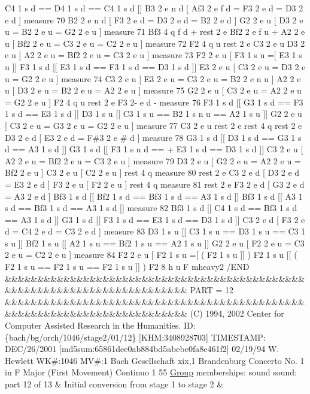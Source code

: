 C4 1 s d == D4 1 s d == C4 1 s d \mbox{]}\mbox{]} B3 2 e n d \mbox{[} Af3 2 e f d = F3 2 e d = D3 2 e d \mbox{]} measure 70 B2 2 e n d \mbox{[} F3 2 e d = D3 2 e d = B2 2 e d \mbox{]} G2 2 e u \mbox{[} D3 2 e u = B2 2 e u = G2 2 e u \mbox{]} measure 71 Bf3 4 q f d + rest 2 e Bf2 2 e f u + A2 2 e u \mbox{[} Bf2 2 e u = C3 2 e u = C2 2 e u \mbox{]} measure 72 F2 4 q u rest 2 e C3 2 e u D3 2 e u \mbox{[} A2 2 e u = Bf2 2 e u = C3 2 e u \mbox{]} measure 73 F2 2 e u \mbox{[} F3 1 s u =\mbox{[} E3 1 s u \mbox{]}\mbox{]} F3 1 s d \mbox{[}\mbox{[} E3 1 s d == F3 1 s d == D3 1 s d \mbox{]}\mbox{]} E3 2 e u \mbox{[} C3 2 e u = D3 2 e u = G2 2 e u \mbox{]} measure 74 C3 2 e u \mbox{[} E3 2 e u = C3 2 e u = B2 2 e n u \mbox{]} A2 2 e u \mbox{[} D3 2 e u = B2 2 e u = A2 2 e u \mbox{]} measure 75 G2 2 e u \mbox{[} C3 2 e u = A2 2 e u = G2 2 e u \mbox{]} F2 4 q u rest 2 e F3 2-\/ e d -\/ measure 76 F3 1 s d \mbox{[}\mbox{[} G3 1 s d == F3 1 s d == E3 1 s d \mbox{]}\mbox{]} D3 1 s u \mbox{[}\mbox{[} C3 1 s u == B2 1 s n u == A2 1 s u \mbox{]}\mbox{]} G2 2 e u \mbox{[} C3 2 e u = G3 2 e u = G2 2 e u \mbox{]} measure 77 C3 2 e u rest 2 e rest 4 q rest 2 e D3 2 e d \mbox{[} E3 2 e d = F\#3 2 e \# d \mbox{]} measure 78 G3 1 s d \mbox{[}\mbox{[} D3 1 s d == G3 1 s d == A3 1 s d \mbox{]}\mbox{]} G3 1 s d \mbox{[}\mbox{[} F3 1 s n d == + E3 1 s d == D3 1 s d \mbox{]}\mbox{]} C3 2 e u \mbox{[} A2 2 e u = Bf2 2 e u = C3 2 e u \mbox{]} measure 79 D3 2 e u \mbox{[} G2 2 e u = A2 2 e u = Bf2 2 e u \mbox{]} C3 2 e u \mbox{[} C2 2 e u \mbox{]} rest 4 q measure 80 rest 2 e C3 2 e d \mbox{[} D3 2 e d = E3 2 e d \mbox{]} F3 2 e u \mbox{[} F2 2 e u \mbox{]} rest 4 q measure 81 rest 2 e F3 2 e d \mbox{[} G3 2 e d = A3 2 e d \mbox{]} Bf3 1 s d \mbox{[}\mbox{[} Bf2 1 s d == Bf3 1 s d == A3 1 s d \mbox{]}\mbox{]} Bf3 1 s d \mbox{[}\mbox{[} A3 1 s d == Bf3 1 s d == A3 1 s d \mbox{]}\mbox{]} measure 82 Bf3 1 s d \mbox{[}\mbox{[} C4 1 s d == Bf3 1 s d == A3 1 s d \mbox{]}\mbox{]} G3 1 s d \mbox{[}\mbox{[} F3 1 s d == E3 1 s d == D3 1 s d \mbox{]}\mbox{]} C3 2 e d \mbox{[} F3 2 e d = C4 2 e d = C3 2 e d \mbox{]} measure 83 D3 1 s u \mbox{[}\mbox{[} C3 1 s u == D3 1 s u == C3 1 s u \mbox{]}\mbox{]} Bf2 1 s u \mbox{[}\mbox{[} A2 1 s u == Bf2 1 s u == A2 1 s u \mbox{]}\mbox{]} G2 2 e u \mbox{[} F2 2 e u = C3 2 e u = C2 2 e u \mbox{]} measure 84 F2 2 e u \mbox{[} F2 1 s u =\mbox{[} ( F2 1 s u \mbox{]}\mbox{]} ) F2 1 s u \mbox{[}\mbox{[} ( F2 1 s u == F2 1 s u == F2 1 s u \mbox{]}\mbox{]} ) F2 8 h u F mheavy2 /\+E\+ND \&\&\&\&\&\&\&\&\&\&\&\&\&\&\&\&\&\&\&\&\&\&\&\&\&\&\&\&\&\&\&\&\&\&\&\&\&\&\&\&\&\&\&\&\&\&\&\&\&\&\&\&\&\&\&\&\&\&\&\&\&\&\&\&\&\&\&\&\&\&\&\&\&\& P\+A\+RT = 12 \&\&\&\&\&\&\&\&\&\&\&\&\&\&\&\&\&\&\&\&\&\&\&\&\&\&\&\&\&\&\&\&\&\&\&\&\&\&\&\&\&\&\&\&\&\&\&\&\&\&\&\&\&\&\&\&\&\&\&\&\&\&\&\&\&\&\&\&\&\&\&\&\&\& (C) 1994, 2002 Center for Computer Assisted Research in the Humanities. ID\+: \{bach/bg/orch/1046/stage2/01/12\} \mbox{[}K\+HM\+:3408928703\mbox{]} T\+I\+M\+E\+S\+T\+A\+MP\+: D\+E\+C/26/2001 \mbox{[}md5sum\+:65861dee0ab884bd5abebe0fa8e461f2\mbox{]} 02/19/94 W. Hewlett WK\#\+:1046 MV\#\+:1 Bach Gesellschaft xix,1 Brandenburg Concerto No. 1 in F Major (First Movement) Continuo 1 55 \hyperlink{class_group}{Group} memberships\+: sound sound\+: part 12 of 13 \& Initial conversion from stage 1 to stage 2 \& 